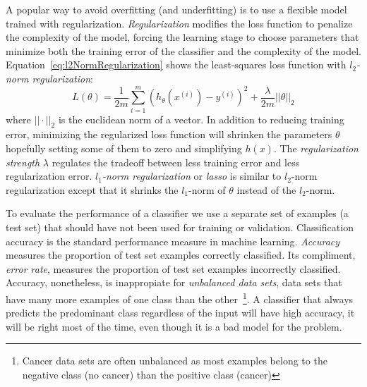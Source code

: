 A popular way to avoid overfitting (and underfitting) is to use a flexible model trained with regularization. \emph{Regularization} modifies the loss function to penalize the complexity of the model, forcing the learning stage to choose parameters that minimize both the training error of the classifier and the complexity of the model. Equation~\ref{eq:l2NormRegularization} shows the least-squares loss function with \emph{$l_2$-norm regularization}:
\begin{equation}
	L(\theta) =  \frac{1}{2m}\sum_{i=1}^m(h_\theta(x^{(i)}) - y^{(i)})^2 + \frac{\lambda}{2m} ||\theta||_2
	\label{eq:l2NormRegularization}
\end{equation}
where $||\cdot||_2$ is the euclidean norm of a vector. In addition to reducing training error, minimizing the regularized loss function will shrinken the parameters $\theta$ hopefully setting some of them to zero and simplifying $h(x)$. The \emph{regularization strength} $\lambda$ regulates the tradeoff between less training error and less regularization error. \emph{$l_1$-norm regularization} or \emph{lasso} is similar to $l_2$-norm regularization except that it shrinks the $l_1$-norm of $\theta$ instead of the $l_2$-norm.

To evaluate the performance of a classifier we use a separate set of examples (a test set) that should have not been used for training or validation. Classification accuracy is the standard performance measure in machine learning. \emph{Accuracy} measures the proportion of test set examples correctly classified. Its compliment, \emph{error rate}, measures the proportion of test set examples incorrectly classified. Accuracy, nonetheless, is inappropiate for \emph{unbalanced data sets}, data sets that have many more examples of one class than the other~\footnote{Cancer data sets are often unbalanced as most examples belong to the negative class (no cancer) than the positive class (cancer)}. A classifier that always predicts the predominant class regardless of the input will have high accuracy, it will be right most of the time, even though it is a bad model for the problem.

